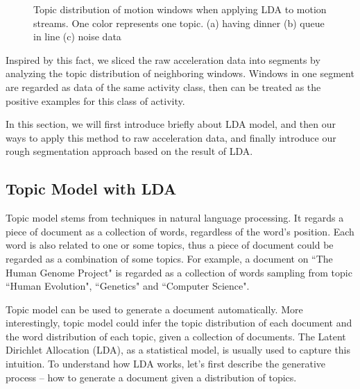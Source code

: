 \documentclass{sigchi}
\begin{document}
\begin{figure}
    \caption{Topic distribution of motion windows when applying LDA to motion streams. One color represents one topic. (a) having dinner (b) queue in line (c) noise data }
    \label{fig: tm-intuition}
\end{figure}

 Inspired by this fact, we sliced the raw acceleration data into segments by analyzing the topic distribution of neighboring windows.
 Windows in one segment are regarded as data of the same activity class, then can be treated as the positive examples for this class of activity.

 In this section, we will first introduce briefly about LDA model, and then our ways to apply this method to raw acceleration data, and finally introduce our rough segmentation approach based on the result of LDA.

\subsection{Topic Model with LDA}

    Topic model \cite{randell2000context} stems from techniques in natural language processing.
    It regards a piece of document as a collection of words, regardless of the word's position.
    Each word is also related to one or some topics, thus a piece of document could be regarded as a combination of some topics.
    For example, a document on ``The Human Genome Project" is regarded as a collection of words sampling from topic ``Human Evolution", ``Genetics" and ``Computer Science".

    Topic model can be used to generate a document automatically.
    More interestingly, topic model could infer the topic distribution of each document and the word distribution of each topic, given a collection of documents.
    The Latent Dirichlet Allocation (LDA), as a statistical model, is usually used to capture this intuition.
    To understand how LDA works, let's first describe the generative process -- how to generate a document given a distribution of topics.
\end{document}

